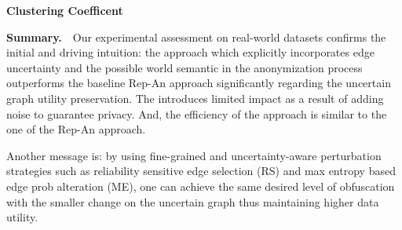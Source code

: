 \textbf{Clustering Coefficent}


\textbf{Summary.}~~Our experimental assessment on real-world datasets confirms the initial and driving intuition: the {\SysNameNS} approach which explicitly incorporates edge uncertainty and the possible world semantic in the anonymization process outperforms the baseline \textsf{Rep-An} approach significantly regarding the uncertain graph utility preservation. The {\SysNameNS} introduces limited impact as a result of adding noise to guarantee privacy. And, the efficiency of the {\SysNameNS} approach is similar to the one of the \textsf{Rep-An} approach. 

Another message is: by using fine-grained and uncertainty-aware perturbation strategies such as reliability sensitive edge selection (RS) and max entropy based edge prob alteration (ME), one can achieve the same desired level of obfuscation with the smaller change on the uncertain graph thus maintaining higher data utility. 




